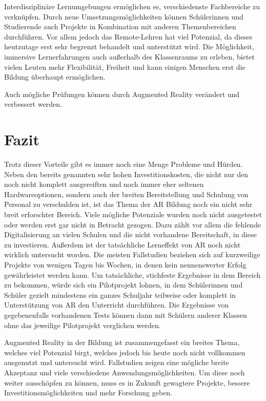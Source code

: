 \documentclass[conference]{IEEEtran}
\begin{document}
Interdisziplinäre Lernumgebungen ermöglichen es, verschiedenste Fachbereiche zu verknüpfen. Durch neue Umsetzungsmöglichkeiten können Schülerinnen und Studierende auch Projekte in Kombination mit anderen Themenbereichen durchführen. 
Vor allem jedoch das Remote-Lehren hat viel Potenzial, da dieses heutzutage erst sehr begrenzt behandelt und unterstützt wird. Die Möglichkeit, immersive Lernerfahrungen auch außerhalb des Klassenraums zu erleben, bietet vielen Leuten mehr Flexibilität, Freiheit und kann einigen Menschen erst die Bildung überhaupt ermöglichen. 

Auch mögliche Prüfungen können durch Augmented Reality verändert und verbessert werden.

\section{Fazit}
Trotz dieser Vorteile gibt es immer noch eine Menge Probleme und Hürden. Neben den bereits genannten sehr hohen Investitionskosten, die nicht nur den noch nicht komplett ausgereiften
und noch immer eher seltenen Hardwareoptionen, sondern auch der breiten Bereitstellung und Schulung von Personal zu verschulden ist, ist das Thema der AR Bildung noch ein nicht sehr
breit erforschter Bereich. Viele mögliche Potenziale wurden noch nicht ausgetestet oder werden erst gar nicht in Betracht gezogen. Dazu zählt vor allem die fehlende Digitalisierung 
an vielen Schulen und die nicht vorhandene Bereitschaft, in diese zu investieren. Außerdem ist der tatsächliche Lerneffekt von AR noch nicht wirklich untersucht worden. Die meisten Fallstudien beziehen sich auf kurzweilige Projekte von wenigen Tagen bis Wochen, in denen kein nennenswerter Erfolg gewährleistet werden kann. Um tatsächliche, stichfeste Ergebnisse in dem Bereich zu bekommen, würde sich ein Pilotprojekt lohnen, in dem Schülerinnen und Schüler gezielt mindestens ein ganzes Schuljahr teilweise oder komplett in Unterstützung von AR den Unterricht durchführen.
Die Ergebnisse von gegebenenfalls vorhandenen Tests können dann mit Schülern anderer Klassen ohne das jeweilige Pilotprojekt verglichen werden.

Augmented Reality in der Bildung ist zusammengefasst ein breites Thema, welches viel Potenzial birgt, welches jedoch bis heute noch nicht vollkommen ausgenutzt und untersucht wird.
Fallstudien zeigen eine mögliche breite Akzeptanz und viele verschiedene Anwendungsmöglichkeiten. Um diese noch weiter ausschöpfen zu können, muss es in Zukunft gewagtere Projekte, 
bessere Investitionsmöglichkeiten und mehr Forschung geben. \cite{b13}
\end{document}
